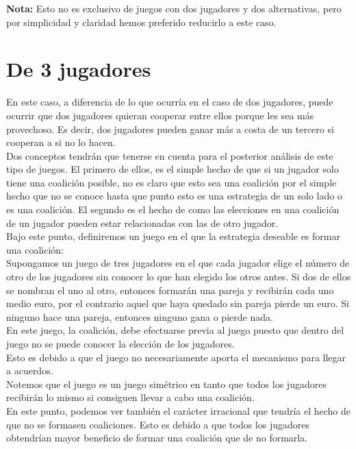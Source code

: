 \documentclass[10pt,a4paper]{book}
\begin{document}
\textbf{Nota:} Esto no es exclusivo de juegos con dos jugadores y dos alternativas, pero por simplicidad y claridad hemos preferido reducirlo a este caso. \\


\section{De 3 jugadores}

En este caso, a diferencia de lo que ocurría en el caso de dos jugadores, puede ocurrir que dos jugadores quieran cooperar entre ellos porque les sea más provechoso. Es decir, dos jugadores pueden ganar más a costa de un tercero si cooperan a si no lo hacen.\\

Dos conceptos tendrán que tenerse en cuenta para el posterior análisis de este tipo de juegos. El primero de ellos, es el simple hecho de que si un jugador solo tiene una coalición posible, no es claro que esto sea una coalición por el simple hecho que no se conoce hasta que punto esto es una estrategia de un solo lado o es una coalición. El segundo es el hecho de como las elecciones en una coalición de un jugador pueden estar relacionadas con las de otro jugador. \\

Bajo este punto, definiremos un juego en el que la estrategia deseable es formar una coalición:\\
Supongamos un juego de tres jugadores en el que cada jugador elige el número de otro de los jugadores sin conocer lo que han elegido los otros antes. Si dos de ellos se nombran el uno al otro, entonces formarán una pareja y recibirán cada uno medio euro, por el contrario aquel que haya quedado sin pareja pierde un euro. Si ninguno hace una pareja, entonces ninguno gana o pierde nada.\\
En este juego, la coalición, debe efectuarse previa al juego puesto que dentro del juego no se puede conocer la elección de los jugadores.\\
Esto es debido a que el juego no necesariamente aporta el mecanismo para llegar a acuerdos.\\
Notemos que el juego es un juego simétrico en tanto que todos los jugadores recibirán lo mismo si consiguen llevar a cabo una coalición. \\
En este punto, podemos ver también el carácter irracional que tendría el hecho de que no se formasen coaliciones. Esto es debido a que todos los jugadores obtendrían mayor beneficio de formar una coalición que de no formarla.\\
\end{document}
